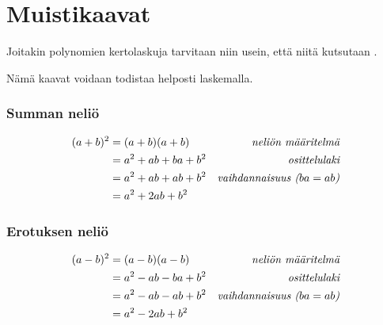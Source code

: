 \section{Muistikaavat}



Joitakin polynomien kertolaskuja tarvitaan niin usein, että niitä kutsutaan .


Nämä kaavat voidaan todistaa helposti laskemalla. %

\subsubsection*{Summan neliö}

\begin{align*}
(a+b)^2 &= (a+b)(a+b) &\emph{neliön määritelmä} \\
&= a^2+ab+ba+b^2 &\emph{osittelulaki} \\
&= a^2+ab+ab+b^2 &\emph{vaihdannaisuus ($ba=ab$)} \\
&= a^2+2ab+b^2
\end{align*}

\subsubsection*{Erotuksen neliö}

\begin{align*}
(a-b)^2 &= (a-b)(a-b) &\emph{neliön määritelmä} \\
&= a^2-ab-ba+b^2 &\emph{osittelulaki} \\
&= a^2-ab-ab+b^2 &\emph{vaihdannaisuus ($ba=ab$)} \\
&= a^2-2ab+b^2
\end{align*}

